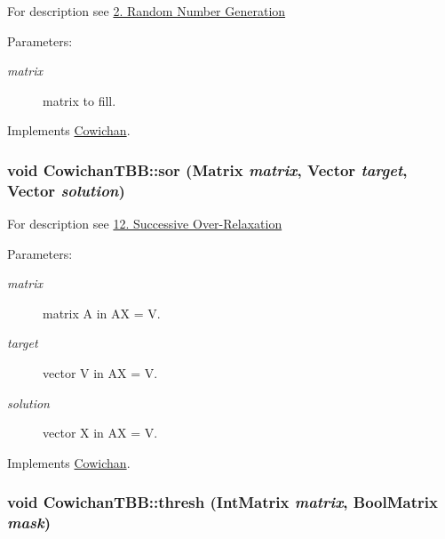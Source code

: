 For description see \hyperlink{index_randmat_sec}{2. Random Number Generation} \begin{Desc}
\item[Parameters:]
\begin{description}
\item[{\em matrix}]matrix to fill. \end{description}
\end{Desc}


Implements \hyperlink{class_cowichan_c44cacf9d9e363a5b076bcee8b9a7a73}{Cowichan}.\hypertarget{class_cowichan_t_b_b_dbb32ce457d0edca6815ab1cb2459276}{
\subsubsection[{sor}]{\setlength{\rightskip}{0pt plus 5cm}void CowichanTBB::sor ({\bf Matrix} {\em matrix}, \/  {\bf Vector} {\em target}, \/  {\bf Vector} {\em solution})}}
\label{class_cowichan_t_b_b_dbb32ce457d0edca6815ab1cb2459276}


For description see \hyperlink{index_sor_sec}{12. Successive Over-Relaxation} \begin{Desc}
\item[Parameters:]
\begin{description}
\item[{\em matrix}]matrix A in AX = V. \item[{\em target}]vector V in AX = V. \item[{\em solution}]vector X in AX = V. \end{description}
\end{Desc}


Implements \hyperlink{class_cowichan_92d8d9ae77208115fdfe69e1174f601c}{Cowichan}.\hypertarget{class_cowichan_t_b_b_3306d21f0b3d12cc2e3b050b99812a27}{
\subsubsection[{thresh}]{\setlength{\rightskip}{0pt plus 5cm}void CowichanTBB::thresh ({\bf IntMatrix} {\em matrix}, \/  {\bf BoolMatrix} {\em mask})}}
\label{class_cowichan_t_b_b_3306d21f0b3d12cc2e3b050b99812a27}



